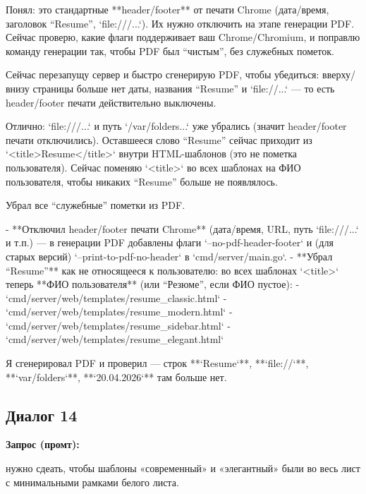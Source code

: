 \documentclass[a4paper, 14pt]{extarticle} %
\begin{document}
\begin{AnswerBlock}

Понял: это стандартные **header/footer** от печати Chrome (дата/время, заголовок “Resume”, `file:///...`). Их нужно отключить на этапе генерации PDF. Сейчас проверю, какие флаги поддерживает ваш Chrome/Chromium, и поправлю команду генерации так, чтобы PDF был “чистым”, без служебных пометок.

Сейчас перезапущу сервер и быстро сгенерирую PDF, чтобы убедиться: вверху/внизу страницы больше нет даты, названия “Resume” и `file://...` — то есть header/footer печати действительно выключены.

Отлично: `file:///...` и путь `/var/folders...` уже убрались (значит header/footer печати отключились). Оставшееся слово “Resume” сейчас приходит из `<title>Resume</title>` внутри HTML-шаблонов (это не пометка пользователя). Сейчас поменяю `<title>` во всех шаблонах на ФИО пользователя, чтобы никаких “Resume” больше не появлялось.

Убрал все “служебные” пометки из PDF.

- **Отключил header/footer печати Chrome** (дата/время, URL, путь `file:///...` и т.п.) — в генерации PDF добавлены флаги `--no-pdf-header-footer` и (для старых версий) `--print-to-pdf-no-header` в `cmd/server/main.go`.
- **Убрал “Resume”** как не относящееся к пользователю: во всех шаблонах `<title>` теперь **ФИО пользователя** (или “Резюме”, если ФИО пустое):
  - `cmd/server/web/templates/resume_classic.html`
  - `cmd/server/web/templates/resume_modern.html`
  - `cmd/server/web/templates/resume_sidebar.html`
  - `cmd/server/web/templates/resume_elegant.html`

Я сгенерировал PDF и проверил — строк **`Resume`**, **`file://`**, **`var/folders`**, **`20.04.2026`** там больше нет.

\end{AnswerBlock}

\subsection*{Диалог 14}

\textbf{Запрос (промт):}

\begin{PromptBlock}

нужно сдеать, чтобы шаблоны «современный» и «элегантный» были во весь лист с минимальными рамками белого листа.

\end{PromptBlock}
\end{document}
